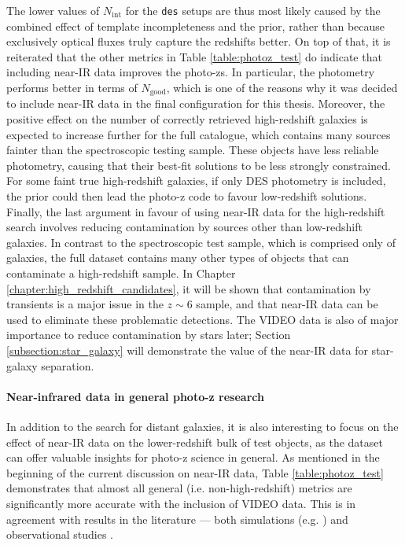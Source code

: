 The lower values of $N_{\mathrm{int}}$ for the \texttt{des} setups are thus most likely caused by the combined effect of template incompleteness and the prior, rather than because exclusively optical fluxes truly capture the redshifts better. On top of that, it is reiterated that the other metrics in Table \ref{table:photoz_test} do indicate that including near-IR data improves the photo-zs. In particular, the \DESVIDEO photometry performs better in terms of $N_{\mathrm{good}}$, which is one of the reasons why it was decided to include near-IR data in the final configuration for this thesis. Moreover, the positive effect on the number of correctly retrieved high-redshift galaxies is expected to increase further for the full \DESVIDEO catalogue, which contains many sources fainter than the spectroscopic testing sample. These objects have less reliable photometry, causing that their best-fit solutions to be less strongly constrained. For some faint true high-redshift galaxies, if only DES photometry is included, the prior could then lead the photo-z code to favour low-redshift solutions. Finally, the last argument in favour of using near-IR data for the high-redshift search involves reducing contamination by sources other than low-redshift galaxies. In contrast to the spectroscopic test sample, which is comprised only of galaxies, the full dataset contains many other types of objects that can contaminate a high-redshift sample. In Chapter \ref{chapter:high_redshift_candidates}, it will be shown that contamination by transients is a major issue in the $z\sim6$ sample, and that near-IR data can be used to eliminate these problematic detections. The VIDEO data is also of major importance to reduce contamination by stars later; Section \ref{subsection:star_galaxy} will demonstrate the value of the near-IR data for star-galaxy separation. \par



\paragraph{Near-infrared data in general photo-z research}
In addition to the search for distant galaxies, it is also interesting to focus on the effect of near-IR data on the lower-redshift bulk of test objects, as the \DESVIDEO dataset can offer valuable insights for photo-z science in general. As mentioned in the beginning of the current discussion on near-IR data, Table \ref{table:photoz_test} demonstrates that almost all general (i.e. non-high-redshift) metrics are significantly more accurate with the inclusion of VIDEO data. This is in agreement with results in the literature --- both  simulations (e.g. \citealt{2008MNRAS.386.1219B,2008MNRAS.387..969A})  and observational studies \citep{2001AJ....122.2205R, 2013MNRAS.428.1281J, 2015MNRAS.446.2523B, 2019NatAs...3..212S}. \par



